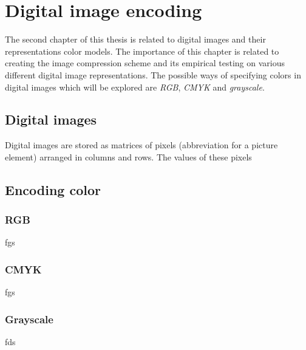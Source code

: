 \documentclass[thesis=M,english]{FITthesis}[2012/10/20]
\begin{document}

\chapter{Digital image encoding}
\label{ch:image-encoding}
The second chapter of this thesis is related to digital images and their
representations color models. The importance of this chapter is related to
creating the image compression scheme and its empirical testing on
various different digital image representations. The possible ways of
specifying colors in digital images which will be explored are \emph{RGB},
\emph{CMYK} and \emph{grayscale}.

\section{Digital images}
Digital images are stored as matrices of pixels (abbreviation for a picture
element) arranged in columns and rows. The values of these pixels 

\section{Encoding color}

\subsection{RGB}
fgs

\subsection{CMYK}
fgs

\subsection{Grayscale}
fds
\end{document}
